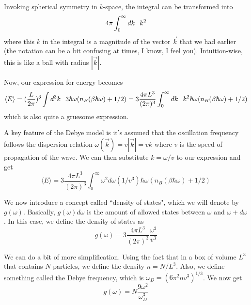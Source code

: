 \documentclass[12pt]{article}
\begin{document}
\vspace{0.25 in}

Invoking spherical symmetry in $k$-space, the integral can be transformed into
\begin{equation*}
    4\pi\int_0^\infty dk\hspace{0.1 in}k^2
\end{equation*}
where this $k$ in the integral is a magnitude of the vector $\vec{k}$ that we had earlier (the notation can be a bit confusing at times, I know, I feel you). Intuition-wise, this is like a ball with radius $|\vec{k}|$.

\vspace{0.25 in}

Now, our expression for energy becomes
\begin{equation*}
    \langle E\rangle=(\frac{L}{2\pi})^3\int d^3k\hspace{0.1 in}3\hbar\omega(n_B(\beta\hbar\omega)+1/2)=3\frac{4\pi L^3}{(2\pi)^3}\int_0^{\infty}dk\hspace{0.1 in}k^2\hbar\omega(n_B(\beta\hbar\omega)+1/2)
\end{equation*}
which is also quite a gruesome expression.

\vspace{0.25 in}

A key feature of the Debye model is it's assumed that the oscillation frequency follows the dispersion relation $\omega(\vec{k})=v|\vec{k}|=vk$ where $v$ is the speed of propagation of the wave. We can then substitute $k=\omega/v$ to our expression and get
\begin{equation*}
    \langle E\rangle=3\frac{4\pi L^3}{(2\pi)^3}\int_0^{\infty}\omega^2d\omega(1/v^3)\hbar\omega(n_B(\beta\hbar\omega)+1/2)
\end{equation*}

\newpage
We now introduce a concept called ``density of states", which we will denote by $g(\omega)$. Basically, $g(\omega)d\omega$ is the amount of allowed states between $\omega$ and $\omega+d\omega$. In this case, we define the density of states as
\begin{equation*}
    g(\omega)=3\frac{4\pi L^3}{(2\pi)^3}\frac{\omega^2}{v^3}
\end{equation*}

\vspace{0.25 in}

We can do a bit of more simplification. Using the fact that in a box of volume $L^3$ that contains $N$ particles, we define the density $n=N/L^3$. Also, we define something called the Debye frequency, which is $\omega_D=(6\pi^2nv^3)^{1/3}$. We now get
\begin{equation*}
    g(\omega)=N\frac{9\omega^2}{\omega_D^3}
\end{equation*}
\end{document}
